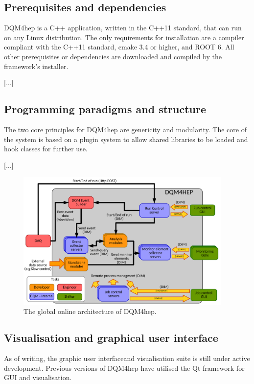 \subsection{Prerequisites and dependencies}

DQM4hep is a C++ application, written in the C++11 standard, that can run on any Linux distribution. The only requirements for installation are a compiler compliant with the C++11 standard, cmake 3.4 or higher, and ROOT 6. All other prerequisites or dependencies are downloaded and compiled by the framework's installer. 

[...]

\subsection{Programming paradigms and structure}

The two core principles for DQM4hep are genericity and modularity. The core of the system is based on a plugin system to allow shared libraries to be loaded and hook classes for further use. \cite{aida2020-milestone-dqm4hep}

[...]

\begin{figure}[h]
	\centering
	\includegraphics[width=0.95\textwidth]{../Pictures/GlobalArchitectureDiagram.pdf}
	\caption{The global online architecture of DQM4hep.}
	\label{figure:daq/dqm4hep/architecture}
\end{figure}

\subsection{Visualisation and graphical user interface}
As of writing, the graphic user interfaceand visualisation suite is still under active development.  Previous versions of DQM4hep have utilised the Qt framework for GUI and visualisation.

